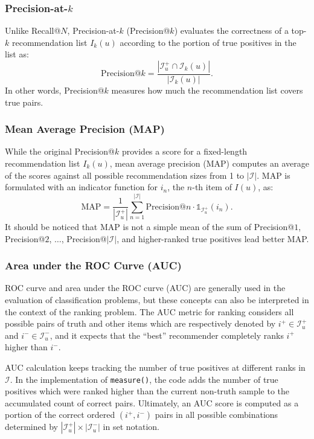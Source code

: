 \subsubsection{Precision-at-$k$}

Unlike Recall@$N$, Precision-at-$k$ (Precision@$k$) evaluates the correctness of a top-$k$ recommendation list $I_k(u)$ according to the portion of true positives in the list as:
$$
\mathrm{Precision@}k = \frac{|\mathcal{I}^+_u \cap \mathcal{I}_k(u)|}{|\mathcal{I}_k(u)|}.
$$
In other words, Precision@$k$ measures how much the recommendation list covers true pairs.

\subsubsection{Mean Average Precision (MAP)}

While the original Precision@$k$ provides a score for a fixed-length recommendation list $I_k(u)$, mean average precision (MAP) computes an average of the scores against all possible recommendation sizes from 1 to $|\mathcal{I}|$. MAP is formulated with an indicator function for $i_n$, the $n$-th item of $I(u)$, as:
\begin{equation*}
\mathrm{MAP} = \frac{1}{|\mathcal{I}^+_u|} \sum_{n = 1}^{|\mathcal{I}|} \mathrm{Precision@}n \cdot \mathds{1}_{\mathcal{I}^+_u}(i_n).
\end{equation*}
It should be noticed that MAP is not a simple mean of the sum of Precision@$1$, Precision@$2$, $\dots$, Precision@$|\mathcal{I}|$, and higher-ranked true positives lead better MAP.

\subsubsection{Area under the ROC Curve (AUC)}

ROC curve and area under the ROC curve (AUC) are generally used in the evaluation of classification problems, but these concepts can also be interpreted in the context of the ranking problem. The AUC metric for ranking considers all possible pairs of truth and other items which are respectively denoted by $i^+ \in \mathcal{I}^+_u$ and $i^- \in \mathcal{I}^-_u$, and it expects that the ``best'' recommender completely ranks $i^+$ higher than $i^-$.

AUC calculation keeps tracking the number of true positives at different ranks in $\mathcal{I}$. In the implementation of \texttt{measure()}, the code adds the number of true positives which were ranked higher than the current non-truth sample to the accumulated count of correct pairs. Ultimately, an AUC score is computed as a portion of the correct ordered $(i^+, i^-)$ pairs in all possible combinations determined by $|\mathcal{I}^+_u| \times |\mathcal{I}^-_u|$ in set notation. 

